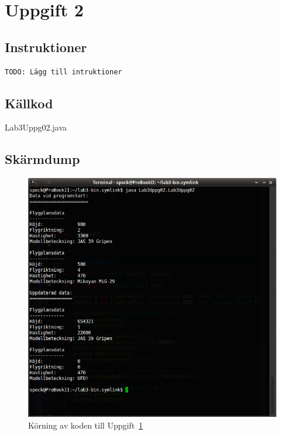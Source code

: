 \section{Uppgift 2}\label{sec:uppg02}

\subsection{Instruktioner}
\begin{verbatim}
TODO: Lägg till intruktioner
\end{verbatim}


\subsection{Källkod}
\caption{Lab3Uppg02.java}
\label{src:uppg02}


\subsection{Skärmdump}
\begin{figure}[htbp]
    \centering
        \includegraphics[width=\linewidth]{img/02.png}
    \caption{Körning av koden till Uppgift~\ref{sec:uppg02}}
    \label{fig:uppg02-screenshot}
\end{figure}

